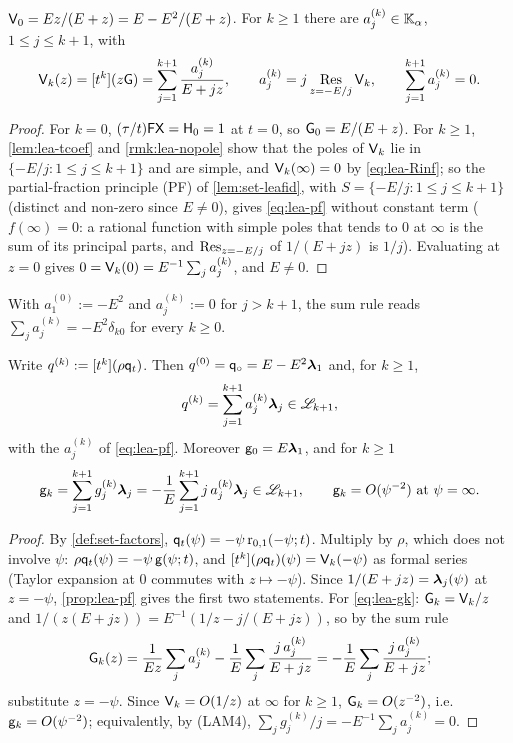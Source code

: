 \begin{prop}
\label{prop:lea-pf}
$\mathsf{V}_0 = Ez/(E+z) = E - E^2/(E+z)$. For $k\geq 1$ there are $a_j^{(k)}\in\mathbb{K}_{\alpha}$, $1\leq j\leq k+1$, with
\begin{equation}
\label{eq:lea-pf}
\mathsf{V}_k(z) = [t^k](z\mathsf{G}) = \sum_{j=1}^{k+1}\frac{a_j^{(k)}}{E+jz},\qquad a_j^{(k)} = j\operatorname*{Res}_{z=-E/j}\mathsf{V}_k,\qquad \sum_{j=1}^{k+1}a_j^{(k)} = 0 .
\end{equation}
\end{prop}

\begin{proof}
For $k = 0$, $(\tau/t)\mathsf{F}\mathsf{X} = \mathsf{H}_0 = 1$ at $t = 0$, so $\mathsf{G}_0 = E/(E+z)$. For $k\geq 1$, \cref{lem:lea-tcoef} and \cref{rmk:lea-nopole} show that the poles of $\mathsf{V}_k$ lie in $\{-E/j : 1\leq j\leq k+1\}$ and are simple, and $\mathsf{V}_k(\infty) = 0$ by \eqref{eq:lea-Rinf}; so the partial-fraction principle (PF) of \cref{lem:set-leafid}, with $S = \{-E/j : 1\leq j\leq k+1\}$ (distinct and non-zero since $E\neq 0$), gives \eqref{eq:lea-pf} without constant term ($f(\infty) = 0$: a rational function with simple poles that tends to $0$ at $\infty$ is the sum of its principal parts, and $\operatorname*{Res}_{z=-E/j}$ of $1/(E+jz)$ is $1/j$). Evaluating at $z = 0$ gives $0 = \mathsf{V}_k(0) = E^{-1}\sum_ja_j^{(k)}$, and $E\neq 0$.
\end{proof}

With $a_1^{(0)} := -E^2$ and $a_j^{(k)} := 0$ for $j > k+1$, the sum rule reads $\sum_ja_j^{(k)} = -E^2\delta_{k0}$ for every $k\geq 0$.

\begin{thm}[(L1), all $k$]
\label{thm:lea-L1}
Write $q^{(k)} := [t^k](\rho\mathsf{q}_{t})$. Then $q^{(0)} = \mathsf{q}_{\circ} = E - E^2\boldsymbol{\lambda}_1$ and, for $k\geq 1$,
\[
q^{(k)} = \sum_{j=1}^{k+1}a_j^{(k)}\boldsymbol{\lambda}_j\in\mathscr{L}_{k+1},
\]
with the $a_j^{(k)}$ of \eqref{eq:lea-pf}. Moreover $\mathsf{g}_0 = E\boldsymbol{\lambda}_1$, and for $k\geq 1$
\begin{equation}
\label{eq:lea-gk}
\mathsf{g}_k = \sum_{j=1}^{k+1}g_j^{(k)}\boldsymbol{\lambda}_j = -\frac{1}{E}\sum_{j=1}^{k+1}j\,a_j^{(k)}\boldsymbol{\lambda}_j\in\mathscr{L}_{k+1},\qquad \mathsf{g}_k = O(\psi^{-2})\ \text{at}\ \psi = \infty .
\end{equation}
\end{thm}

\begin{proof}
By \cref{def:set-factors}, $\mathsf{q}_{t}(\psi) = -\psi\,\mathrm{r}_{0,1}(-\psi;t)$. Multiply by $\rho$, which does not involve $\psi$: $\rho\mathsf{q}_{t}(\psi) = -\psi\,\mathsf{g}(\psi;t)$, and $[t^k](\rho\mathsf{q}_{t})(\psi) = \mathsf{V}_k(-\psi)$ as formal series (Taylor expansion at $0$ commutes with $z\mapsto -\psi$). Since $1/(E+jz) = \boldsymbol{\lambda}_j(\psi)$ at $z = -\psi$, \cref{prop:lea-pf} gives the first two statements. For \eqref{eq:lea-gk}: $\mathsf{G}_k = \mathsf{V}_k/z$ and $1/(z(E+jz)) = E^{-1}(1/z - j/(E+jz))$, so by the sum rule
\[
\mathsf{G}_k(z) = \frac{1}{Ez}\sum_ja_j^{(k)} - \frac{1}{E}\sum_j\frac{j\,a_j^{(k)}}{E+jz} = -\frac{1}{E}\sum_j\frac{j\,a_j^{(k)}}{E+jz};
\]
substitute $z = -\psi$. Since $\mathsf{V}_k = O(1/z)$ at $\infty$ for $k\geq 1$, $\mathsf{G}_k = O(z^{-2})$, i.e.\ $\mathsf{g}_k = O(\psi^{-2})$; equivalently, by (LAM4), $\sum_jg_j^{(k)}/j = -E^{-1}\sum_ja_j^{(k)} = 0$.
\end{proof}

